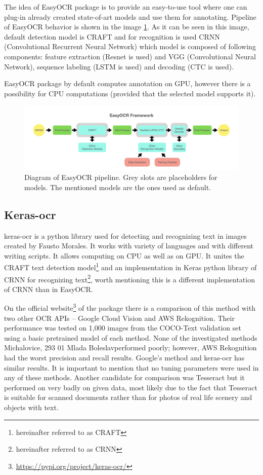 The idea of EasyOCR package is to provide an easy-to-use tool where one can plug-in already created state-of-art models and use them for annotating. Pipeline of EasyOCR behavior is shown in the image \ref*{img:easyocrPipeline}. As it can be seen in this image, default detection model is CRAFT and for recognition is used CRNN (Convolutional Recurrent Neural Network) which model is composed of following components: feature extraction (Resnet is used) and VGG (Convolutional Neural Network), sequence labeling (LSTM is used) and decoding (CTC is used).\cite{easyocr2}

EasyOCR package by default computes annotation on GPU, however there is a possibility for CPU computations (provided that the selected model supports it). 

\begin{figure}[hbtp]
    \centering
    \includegraphics[scale=0.4]{obrazky/easyocr_framework.jpeg}
    \caption{Diagram of EasyOCR pipeline. Grey slots are placeholders for models. The mentioned models are the ones used as default. \cite{easyocr2}}
    \label{img:easyocrPipeline}
\end{figure}

\subsection{Keras-ocr}

keras-ocr is a python library used for detecting and recognizing text in images created by Fausto Morales. It works with variety of languages and with different writing scripts. It allows computing on CPU as well as on GPU.  It unites the CRAFT text detection model\footnote{hereinafter referred to as CRAFT} and an implementation in Keras python library of CRNN for recognizing text\footnote{hereinafter referred to as CRNN}, worth mentioning this is a different implementation of CRNN than in EasyOCR.\cite{keras-ocr1}

On the official website\footnote{\url{https://pypi.org/project/keras-ocr/}} of the package there is a comparison of this method with two other OCR APIs -- Google Cloud Vision and AWS Rekognition. Their performance was tested on 1,000 images from the COCO-Text validation set using a basic pretrained model of each method. None of the investigated methods Michalovice, 293 01 Mlada Boleslavperformed poorly; however, AWS Rekognition had the worst precision and recall results. Google's method and keras-ocr has similar results. It is important to mention that no tuning parameters were used in any of these methods. Another candidate for comparison was Tesseract but it performed on very badly on given data, most likely due to the fact that Tesseract is suitable for scanned documents rather than for photos of real life scenery and objects with text. \cite{keras-ocr1}


